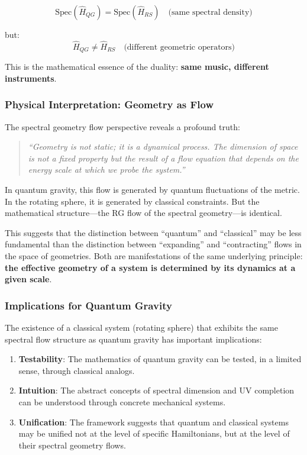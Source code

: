 \documentclass[UTF8]{ctex}\n\documentclass[12pt,a4paper]{article}
\begin{document}
\begin{equation}
    \text{Spec}(\hat{H}_{QG}) = \text{Spec}(\hat{H}_{RS}) \quad \text{(same spectral density)}
\end{equation}

but:
\begin{equation}
    \hat{H}_{QG} \neq \hat{H}_{RS} \quad \text{(different geometric operators)}
\end{equation}

This is the mathematical essence of the duality: \textbf{same music, different instruments}.

\subsubsection{Physical Interpretation: Geometry as Flow}

The spectral geometry flow perspective reveals a profound truth:

\begin{quote}
    \textit{``Geometry is not static; it is a dynamical process. The dimension of space is not a fixed property but the result of a flow equation that depends on the energy scale at which we probe the system.''}
\end{quote}

In quantum gravity, this flow is generated by quantum fluctuations of the metric. In the rotating sphere, it is generated by classical constraints. But the mathematical structure---the RG flow of the spectral geometry---is identical.

This suggests that the distinction between ``quantum'' and ``classical'' may be less fundamental than the distinction between ``expanding'' and ``contracting'' flows in the space of geometries. Both are manifestations of the same underlying principle: \textbf{the effective geometry of a system is determined by its dynamics at a given scale}.

\subsubsection{Implications for Quantum Gravity}

The existence of a classical system (rotating sphere) that exhibits the same spectral flow structure as quantum gravity has important implications:

\begin{enumerate}
    \item \textbf{Testability}: The mathematics of quantum gravity can be tested, in a limited sense, through classical analogs.
    \item \textbf{Intuition}: The abstract concepts of spectral dimension and UV completion can be understood through concrete mechanical systems.
    \item \textbf{Unification}: The framework suggests that quantum and classical systems may be unified not at the level of specific Hamiltonians, but at the level of their spectral geometry flows.
\end{enumerate}
\end{document}

